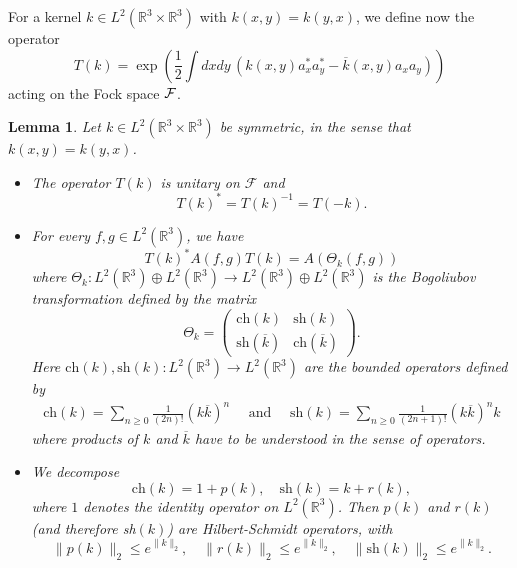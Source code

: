 \documentclass[11pt,a4paper]{article}
\newtheorem{lem}[thm]{Lemma}
\newcommand{\bR}{{\mathbb R}}
\newcommand{\cF}{{\cal F}}
\newcommand{\R}{\mathbb{R}}
\begin{document}
For a kernel $k \in L^2 (\bR^3 \times \bR^3)$ with $k (x,y) = k(y,x)$, we define now the operator 
\begin{equation}\label{eq:Tk-def} T (k) = \exp \left(\frac{1}{2} \int dx dy \, \left(k(x,y) a_x^* a_y^* - \overline{k} (x,y) a_x a_y \right) \right) \end{equation} 
acting on the Fock space $\cF$. 
\begin{lem} \label{l:bt}
Let $k \in L^2(\R^3 \times \R^3)$ be symmetric, in the sense that $k(x,y) = k(y,x)$.
\begin{itemize}
\item[(i)] The operator $T(k)$ is unitary on $\mathcal{F}$ and
  \[
    T(k)^* = T(k)^{-1} = T(-k).
  \]
\item[(ii)] For every $f,g \in L^2 (\bR^3)$, we have 
\begin{equation}\label{eq:TAT} T (k)^* A(f,g) T(k) = A (\Theta_k (f,g)) \end{equation}
where $\Theta_k : L^2 (\bR^3) \oplus L^2 (\bR^3) \to L^2 (\bR^3) \oplus L^2 (\bR^3)$ is the Bogoliubov transformation defined by the matrix 
\[ \Theta_k = \left(\begin{array}{ll} \text{ch} (k)  & \text{sh} (k)  \\ \text{sh} (\overline{k}) & \text{ch} (\overline{k}) \end{array} \right).\]
Here $\text{ch} (k), \text{sh} (k) : L^2 (\bR^3) \to L^2 (\bR^3)$ are the bounded operators defined by 
\[ \begin{split} 
\text{ch} (k) = \sum_{n\geq 0} \frac{1}{(2n)!} (k\overline{k})^n \quad \text{ and }\quad
\text{sh} (k)  = \sum_{n \geq 0} \frac{1}{(2n+1)!} (k\overline{k})^n k \end{split} \]
where products of $k$ and $\overline{k}$ have to be understood in the sense of operators. 
\item[(iii)] We decompose 
\begin{equation}\label{eq:pr-def} \text{ch} (k) = 1 + p (k) , \quad \text{sh} (k) = k + r (k), \end{equation}
where $1$ denotes the identity operator on $L^2 (\bR^3)$. Then $p (k)$ and $r (k)$ (and therefore sh$(k)$) are Hilbert-Schmidt operators, with 
\begin{equation}
 \| p (k) \|_{2}  \le e^{\| k \|_{2}}, \quad 
\| r (k) \|_{2} \le e^{\| k \|_{2}},  \quad \| \text{sh} (k) \|_2 \leq  e^{\| k \|_{2}}.
\end{equation}

\end{itemize}
\end{lem}
\end{document}
